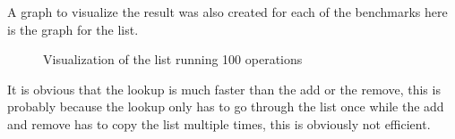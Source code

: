 \documentclass[a4paper,11pt]{article}
\begin{document}
\begin{table}[h]
    \begin{center}
    \caption{The result of the list benchmark when run using 100 operations}
    \label{tab:table1}
    \end{center}
\end{table}

\FloatBarrier{\noindent}
A graph to visualize the result was also created for each of the benchmarks here is the graph for the list.

\begin{figure}[h]
    \centering    
    
    \scalebox{0.8}{}
    \caption{Visualization of the list running 100 operations}   
    \label{tab:figure1} 
    
    \end{figure}
\FloatBarrier{\noindent}

It is obvious that the lookup is much faster than the add or the remove, this is probably because the lookup only has to go through the list once while the add and remove has to copy the list multiple times, this is obviously not efficient.
\end{document}
